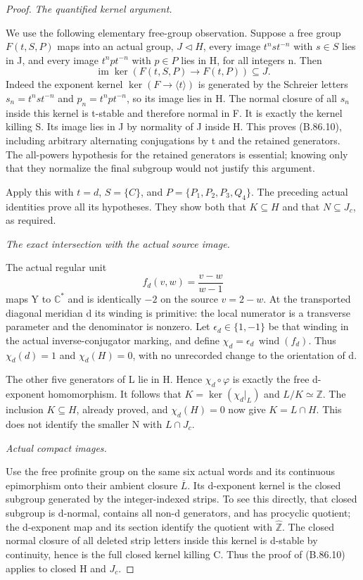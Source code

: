 \begin{proof}
\emph{The quantified kernel argument.}\par
We use the following elementary free-group observation. Suppose a free
group \(F(t,S,P)\) maps into an actual group, \(J\triangleleft H\),
every image \(t^nst^{-n}\) with \(s\in S\) lies in J, and every
image \(t^npt^{-n}\) with \(p\in P\) lies in H, for all integers n.
Then
\[
 \operatorname{im}\ker(F(t,S,P)\to F(t,P))\subseteq J.
\tag{B.86.10}
\]
Indeed the exponent kernel \(\ker(F\to\langle t\rangle)\)
is generated by the Schreier letters \(s_n=t^nst^{-n}\) and
\(p_n=t^npt^{-n}\), so its image lies in H. The normal closure of
all \(s_n\) inside this kernel is t-stable and therefore normal in F.
It is exactly the kernel killing S. Its image lies in J by normality
of J inside H. This proves (B.86.10), including arbitrary alternating
conjugations by t and the retained generators.
The all-powers hypothesis for the retained generators is essential;
knowing only that they normalize the final subgroup would not justify
this argument.

Apply this with \(t=d\), \(S=\{C\}\), and
\(P=\{P_1,P_2,P_3,Q_4\}\). The preceding actual identities prove
all its hypotheses. They show both that \(K\subseteq H\) and that
\(N\subseteq J_c\), as required.

\emph{The exact intersection with the actual source image.}\par
The actual regular unit
\[
                       f_d(v,w)=\frac{v-w}{w-1}
\tag{B.86.11}
\]
maps Y to \(\mathbb C^*\) and is identically \(-2\) on the source
\(v=2-w\). At the transported diagonal meridian d its winding is
primitive: the local numerator is a transverse parameter and the
denominator is nonzero. Let \(\epsilon_d\in\{1,-1\}\) be that
winding in the actual inverse-conjugator marking, and define
\(\chi_d=\epsilon_d\,\operatorname{wind}(f_d)\).
Thus \(\chi_d(d)=1\) and \(\chi_d(H)=0\), with no unrecorded
change to the orientation of d.

The other five generators of L lie in H. Hence
\(\chi_d\circ\varphi\) is exactly the free d-exponent homomorphism.
It follows that \(K=\ker(\chi_d|_L)\) and \(L/K\simeq\mathbb Z\).
The inclusion \(K\subseteq H\), already proved, and
\(\chi_d(H)=0\) now give \(K=L\cap H\). This does not identify
the smaller N with \(L\cap J_c\).

\emph{Actual compact images.}\par
Use the free profinite group on the same six actual words and its
continuous epimorphism onto their ambient closure \(\overline L\).
Its d-exponent kernel is the closed subgroup generated by the
integer-indexed strips. To see this directly, that closed subgroup
is d-normal, contains all non-d generators, and has procyclic
quotient; the d-exponent map and its section identify the quotient
with \(\widehat{\mathbb Z}\).
The closed normal closure of all deleted strip letters inside this
kernel is d-stable by continuity, hence is the full closed kernel
killing C. Thus the proof of (B.86.10) applies to closed H and \(J_c\).


\end{proof}
